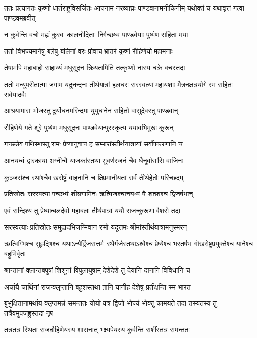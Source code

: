 \threelineshloka
{ततः प्रत्यागतः कृष्णो धार्तराष्ट्रविसर्जितः}
{आजगाम नरव्याघ्रः पाण्डवानामनीकिनीम्}
{यथोक्तं च यथावृत्तं गत्वा पाण्डवमब्रवीत्}


\twolineshloka
{न कुर्वन्ति वचो मह्यं कुरवः कालनोदिताः}
{निर्गच्छध्व पाण्डवेयाः पुष्येण सहिता मया}


\twolineshloka
{ततो विभज्यमानेषु बलेषु बलिनां वरः}
{प्रोवाच भ्रातरं कृष्णं रौहिणेयो महामनाः}


\twolineshloka
{तेषामपि महाबाहो साहाय्यं मधुसूदन}
{क्रियतामिति तत्कृष्णो नास्य चक्रे वचस्तदा}


\threelineshloka
{ततो मन्युपरीतात्मा जगाम यदुनन्दनः}
{तीर्थयात्रां हलधरः सरस्वत्यां महायशाः}
{मैत्रनक्षत्रयोगे स्म सहितः सर्वयादवैः}


\twolineshloka
{आश्रयामास भोजस्तु दुर्योधनमरिन्दमः}
{युयुधानेन सहितो वासुदेवस्तु पाण्डवान्}


\twolineshloka
{रौहिणेये गते शूरे पुष्येण मधुसूदनः}
{पाण्डवेयान्पुरस्कृत्य ययावभिमुखः कूरून्}


\twolineshloka
{गच्छन्नेव पथिस्थस्तु रामः प्रेष्यानुवाच ह}
{सम्भारांस्तीर्थयात्रायां सर्वोपकरणानि च}


\twolineshloka
{आनयध्वं द्वारकाया अग्नीन्वै याजकांस्तथा}
{सुवर्णरजनं चैव धैनूर्वासांसि वाजिनः}


\twolineshloka
{कुञ्जरांश्च रथांश्चैव खरोष्ट्रं वाहनानि च}
{क्षिप्रमानीयतां सर्वं तीर्थहेतोः परिच्छदम्}


\twolineshloka
{प्रतिस्रोतः सरस्वत्या गच्छध्वं शीघ्रगामिनः}
{ऋत्विजश्चानयध्वं वै शतशश्च द्विजर्षभान्}


\twolineshloka
{एवं सन्दिश्य तु प्रेष्यान्बलदेवो महाबलः}
{तीर्थयात्रां ययौ राजन्कुरूणां वैशसे तदा}


\twolineshloka
{सरस्वत्याः प्रतिस्रोतः समुद्रादभिजग्मिवान}
{रामो यदूत्तमः श्रीमांस्तीर्थयात्रामनुस्मरन्}


\threelineshloka
{ऋत्विग्भिश्च सुहृद्भिश्च यथाऽन्यैर्द्विजसत्तमैः}
{रथैर्गजैस्तथाऽश्वैश्च प्रेष्यैश्च भरतर्षभ}
{गोखरोष्ट्रप्रयुक्तैश्च यानैश्च बहुभिर्वृतः}


\twolineshloka
{श्रान्तानां क्लान्तबपुषां शिशूनां विपुलायुषाम्}
{देशेदेशे तु देयानि दानानि विविधानि च}


\twolineshloka
{अर्चायै चार्थिनां राजन्क्लृप्तानि बहुशस्तथा}
{तानि यानीह देशेषु प्रतीक्षन्ति स्म भारत}


बुभुक्षितानामर्थाय क्लृप्तमन्नं समन्ततः
\twolineshloka
{योयो यत्र द्विजो भोज्यं भोक्तुं कामयते तदा}
{तस्यतस्य तु तत्रैवमुपजह्रुस्तदा नृष}


\twolineshloka
{तत्रतत्र स्थिता राजन्रौहिणेयस्य शासनात्}
{भक्ष्यपेयस्य कुर्वन्ति राशींस्तत्र समन्ततः}



